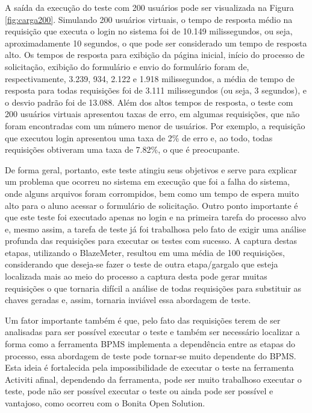 \documentclass[12pt]{article}
\begin{document}
A saída da execução do teste com 200 usuários pode ser visualizada na Figura \ref{fig:carga200}. Simulando 200 usuários virtuais, o tempo de resposta médio na requisição que executa o login no sistema foi de 10.149 milissegundos, ou seja, aproximadamente 10 segundos, o que pode ser considerado um tempo de resposta alto. Os tempos de resposta para exibição da página inicial, início do processo de solicitação, exibição do formulário e envio do formulário foram de, respectivamente, 3.239, 934, 2.122 e 1.918 milissegundos, a média de tempo de resposta para todas requisições foi de 3.111 milissegundos (ou seja, 3 segundos), e o desvio padrão foi de 13.088. Além dos altos tempos de resposta, o teste com 200 usuários virtuais apresentou taxas de erro, em algumas requisições, que não foram encontradas com um número menor de usuários. Por exemplo, a requisição que executou login apresentou uma taxa de 2\% de erro e, ao todo, todas requisições obtiveram uma taxa de 7.82\%, o que é preocupante.

De forma geral, portanto, este teste atingiu seus objetivos e serve para explicar um problema que ocorreu no sistema em execução que foi a falha do sistema, onde alguns arquivos foram corrompidos, bem como um tempo de espera muito alto para o aluno acessar o formulário de solicitação. Outro ponto importante é que este teste foi executado apenas no login e na primeira tarefa do processo alvo e, mesmo assim, a tarefa de teste já foi trabalhosa pelo fato de exigir uma análise profunda das requisições para executar os testes com sucesso. A captura destas etapas, utilizando o BlazeMeter, resultou em uma média de 100 requisições, considerando que deseja-se fazer o teste de outra etapa/gargalo que esteja localizada mais ao meio do processo a captura desta pode gerar muitas requisições o que tornaria difícil a análise de todas requisições para substituir as chaves geradas e, assim, tornaria inviável essa abordagem de teste. 

Um fator importante também é que, pelo fato das requisições terem de ser analisadas para ser possível executar o teste e também ser necessário localizar a forma como a ferramenta BPMS implementa a dependência entre as etapas do processo, essa abordagem de teste pode tornar-se muito dependente do BPMS. Esta ideia é fortalecida pela impossibilidade de executar o teste na ferramenta Activiti afinal, dependendo da ferramenta, pode ser muito trabalhoso executar o teste, pode não ser possível executar o teste ou ainda pode ser possível e vantajoso, como ocorreu com o Bonita Open Solution.
\end{document}
